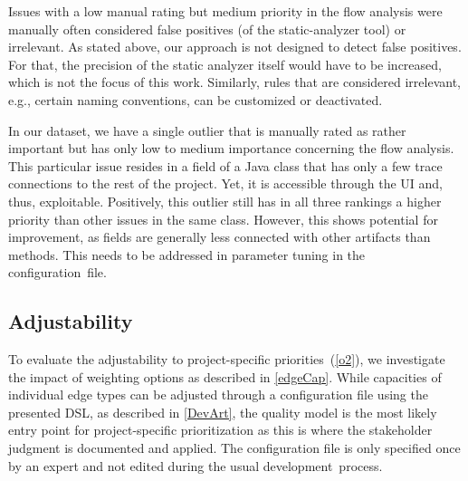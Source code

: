 Issues with a low manual rating but medium priority in the flow analysis were  manually often considered false positives (of the static-analyzer tool) or irrelevant.
As stated above, our approach is not designed to detect false positives.
For that, the precision of the static analyzer itself would have to be increased, which is not the focus of this work.
Similarly, rules that are considered irrelevant, e.g., certain naming conventions, can be customized or deactivated.

In our dataset, we have a single outlier %
that is manually rated as rather important but has only low to medium importance concerning the flow analysis.
This particular issue resides in a field of a Java class that has only a few trace connections to the rest of the project.
Yet, it is accessible through the UI and, thus, exploitable.
Positively, this outlier still has in all three rankings a higher priority than other issues in the same class.
However, this shows potential for improvement, as fields are generally less connected with other artifacts than methods.
This needs to be addressed in parameter tuning in the configuration~file.%






\subsection{Adjustability}
To evaluate the adjustability to project-specific priorities~(\ref{o2}), we investigate the impact of weighting options as described in \autoref{edgeCap}.
While capacities of individual edge types can be adjusted through a configuration file using the presented DSL, as described in \autoref{DevArt}, the quality model is the most likely entry point for project-specific prioritization as this is where the stakeholder judgment is documented and applied.
The configuration file is only specified once by an expert and not edited during the usual development~process.

